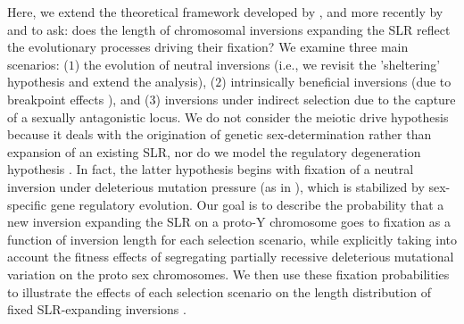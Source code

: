\documentclass{article}[12pt]
\newcommand\hl[1]{%
  \bgroup
  \hskip0pt\color{blue!80!black}%
  #1%
  \egroup
}
\begin{document}
Here, we extend the theoretical framework developed by \citet{vanValenLevins1968, Santos1986}, and more recently by \citet{ConnallonOlito2021} and \citet{Olito-etal-2022} to ask: does the length of chromosomal inversions expanding the SLR reflect the evolutionary processes driving their fixation? We examine three main scenarios: ($1$) the evolution of neutral inversions (i.e., we revisit the 'sheltering' hypothesis and extend the analysis), ($2$) intrinsically beneficial inversions (due to breakpoint effects \citealt{CorbettDetig2016}), and ($3$) inversions under indirect selection due to the capture of a sexually antagonistic locus. We do not consider the meiotic drive hypothesis \citep{UbedaPatten2010} because it deals with the origination of genetic sex-determination rather than expansion of an existing SLR, nor do we model the regulatory degeneration hypothesis \citep[see][]{LenormandRoze2022}. In fact, the latter hypothesis begins with fixation of a neutral inversion under deleterious mutation pressure (as in \citealt{Olito-etal-2022,Jay2022}), which is stabilized by sex-specific gene regulatory evolution. Our goal is to describe the probability that a new inversion expanding the SLR on a proto-Y chromosome goes to fixation as a function of inversion length for each selection scenario, while explicitly taking into account the fitness effects of segregating partially recessive deleterious mutational variation on the proto sex chromosomes. We then use these fixation probabilities to illustrate the effects of each selection scenario on the length distribution of fixed SLR-expanding inversions \citep[after][]{vanValenLevins1968,Santos1986,ConnallonOlito2021}. 

\end{document}
